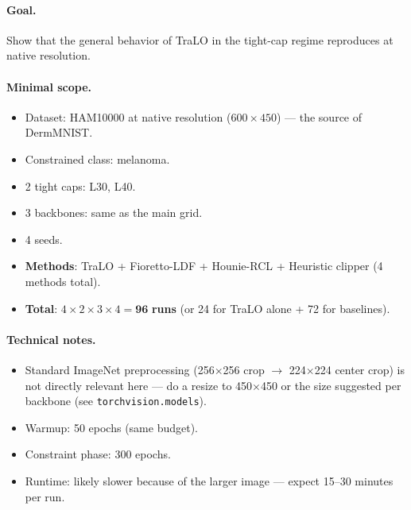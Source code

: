 \documentclass[11pt,a4paper]{article}
\newcommand{\code}[1]{\texttt{#1}}
\begin{document}
\paragraph{Goal.} Show that the general behavior of TraLO in the tight-cap
regime reproduces at native resolution.

\paragraph{Minimal scope.}
\begin{itemize}[nosep]
  \item Dataset: HAM10000 at native resolution ($600\times450$) --- the
        source of DermMNIST.
  \item Constrained class: melanoma.
  \item 2 tight caps: L30, L40.
  \item 3 backbones: same as the main grid.
  \item 4 seeds.
  \item \textbf{Methods}: TraLO + Fioretto-LDF + Hounie-RCL + Heuristic
        clipper (4 methods total).
  \item \textbf{Total}: $4 \times 2 \times 3 \times 4 = \mathbf{96}$
        \textbf{runs} (or 24 for TraLO alone + 72 for baselines).
\end{itemize}

\paragraph{Technical notes.}
\begin{itemize}[nosep]
  \item Standard ImageNet preprocessing (256$\times$256 crop $\to$
        224$\times$224 center crop) is not directly relevant here --- do a
        resize to 450$\times$450 or the size suggested per backbone (see
        \code{torchvision.models}).
  \item Warmup: 50 epochs (same budget).
  \item Constraint phase: 300 epochs.
  \item Runtime: likely slower because of the larger image --- expect
        15--30 minutes per run.
\end{itemize}
\end{document}
